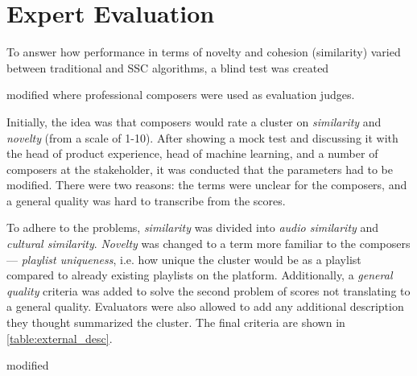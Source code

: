 \documentclass[../report.tex]{subfiles}
\begin{document}
\section{Expert Evaluation}
To answer how performance in terms of novelty and cohesion (similarity) varied between traditional and SSC algorithms, a blind test was created \begin{color}{modified} where professional composers were used as evaluation judges.

Initially, the idea was that composers would rate a cluster on \textit{similarity} and \textit{novelty} (from a scale of 1-10). After showing a mock test and discussing it with the head of product experience, head of machine learning, and a number of composers at the stakeholder, it was conducted that the parameters had to be modified. There were two reasons: the terms were unclear for the composers, and a general quality was hard to transcribe from the scores.

To adhere to the problems, \textit{similarity} was divided into \textit{audio similarity} and \textit{cultural similarity}. \textit{Novelty} was changed to a term more familiar to the composers --- \textit{playlist uniqueness}, i.e. how unique the cluster would be as a playlist compared to already existing playlists on the platform. Additionally, a \textit{general quality} criteria was added to solve the second problem of scores not translating to a general quality. Evaluators were also allowed to add any additional description they thought summarized the cluster. The final criteria are shown in \cref{table:external_desc}.

\medskip
\begin{table}[H]
\begin{color}{modified}
\caption{Description of criteria for external evaluation, each criteria was rated by the composers with an integer scale of 1 to 10}
\label{table:external_desc}
\end{color}
\end{table}


\end{color}
\end{document}
